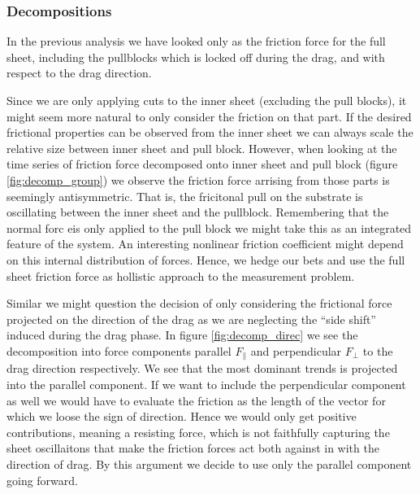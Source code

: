 \subsubsection{Decompositions}
In the previous analysis we have looked only as the friction force for the full
sheet, including the pullblocks which is locked off during the drag, and with
respect to the drag direction. \par
Since we are only applying cuts to the inner sheet (excluding the pull blocks),
it might seem more natural to only consider the friction on that part. If the
desired frictional properties can be observed from the inner sheet we can always
scale the relative size between inner sheet and pull block. However, when
looking at the time series of friction force decomposed onto inner sheet and
pull block (figure \ref{fig:decomp_group}) we observe the friction force arrising
from those parts is seemingly antisymmetric. That is, the fricitonal pull on the
substrate is oscillating between the inner sheet and the pullblock. Remembering
that the normal forc eis only applied to the pull block we might take this as an
integrated feature of the system. An interesting nonlinear friction coefficient
might depend on this internal distribution of forces. Hence, we hedge our bets and
use the full sheet friction force as hollistic approach to the measurement problem.

\par
Similar we might question the decision of
only considering the frictional force projected on the direction of the drag as
we are neglecting the ``side shift'' induced during the drag phase. In figure \ref{fig:decomp_direc} we see the decomposition into force components parallel $F_{\parallel}$ and perpendicular $F_{\perp}$ to the drag direction respectively. We see that the most dominant trends is projected into the parallel component. If we want to include the perpendicular component as well we would have to evaluate the friction as the length of the vector for which we loose the sign of direction. Hence we would only get positive contributions, meaning a resisting force, which is not faithfully capturing the sheet oscillaitons that make the friction forces act both against in with the direction of drag. By this argument we decide to use only the parallel component going forward. 

